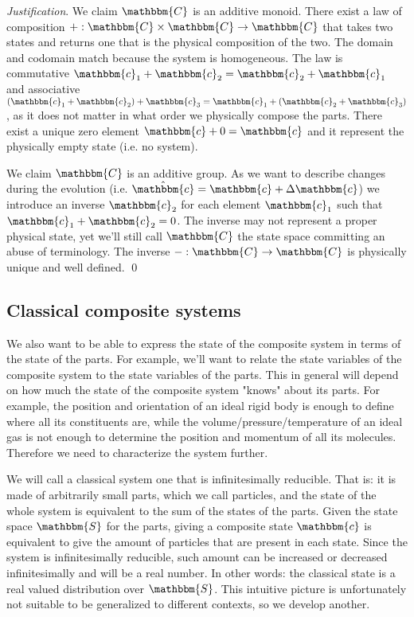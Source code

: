 \documentclass[aps,pra,10pt,twocolumn,floatfix,nofootinbib]{revtex4-1}
\theoremstyle{definition}
\newenvironment{justification}{\emph{Justification}.}{\qed}
\begin{document}
\begin{justification}
We claim $\mathbbm{C}$ is an additive monoid. There exist a law of composition $+ : \mathbbm{C} \times \mathbbm{C} \rightarrow \mathbbm{C}$ that takes two states and returns one that is the physical composition of the two. The domain and codomain match because the system is homogeneous. The law is commutative $\mathbbm{c}_1 +\mathbbm{c}_2 = \mathbbm{c}_2+\mathbbm{c}_1$ and associative $(\mathbbm{c}_1 + \mathbbm{c}_2) + \mathbbm{c}_3 = \mathbbm{c}_1 + (\mathbbm{c}_2 + \mathbbm{c}_3)$, as it does not matter in what order we physically compose the parts. There exist a unique zero element $\mathbbm{c} + 0 = \mathbbm{c}$ and it represent the physically empty state (i.e. no system).

We claim $\mathbbm{C}$ is an additive group. As we want to describe changes during the evolution (i.e. $\hat{\mathbbm{c}} = \mathbbm{c} +\Delta \mathbbm{c}$) we introduce an inverse $\mathbbm{c}_2$ for each element $\mathbbm{c}_1$ such that $\mathbbm{c}_1 + \mathbbm{c}_2 = 0$. The inverse may not represent a proper physical state, yet we'll still call $\mathbbm{C}$ the state space committing an abuse of terminology. The inverse $- : \mathbbm{C} \rightarrow \mathbbm{C}$ is physically unique and well defined.
\end{justification}

\subsection{Classical composite systems}
We also want to be able to express the state of the composite system in terms of the state of the parts. For example, we'll want to relate the state variables of the composite system to the state variables of the parts. This in general will depend on how much the state of the composite system "knows" about its parts. For example, the position and orientation of an ideal rigid body is enough to define where all its constituents are, while the volume/pressure/temperature of an ideal gas is not enough to determine the position and momentum of all its molecules. Therefore we need to characterize the system further.

We will call a classical system one that is infinitesimally reducible. That is: it is made of arbitrarily small parts, which we call particles, and the state of the whole system is equivalent to the sum of the states of the parts. Given the state space $\mathbbm{S}$ for the parts, giving a composite state $\mathbbm{c}$ is equivalent to give the amount of particles that are present in each state. Since the system is infinitesimally reducible, such amount can be increased or decreased infinitesimally and will be a real number. In other words: the classical state is a real valued distribution over $\mathbbm{S}$. This intuitive picture is unfortunately not suitable to be generalized to different contexts, so we develop another.
\end{document}
